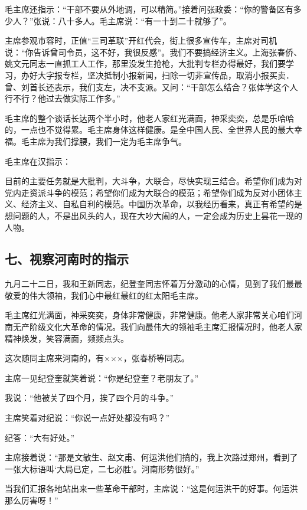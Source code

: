 毛主席还指示：“干部不要从外地调，可以精简。”接着问张政委：“你的警备区有多少人？”张说：八十多人。毛主席说：“有一十到二十就够了”。

主席参观市容时，正值“三司革联”开红代会，街上很多宣传车，主席对司机说：“你告诉曾司令员，这不好，我很反感”。我们不要搞经济主义。上海张春侨、姚文元同志一直抓工人工作，那里没发生抢枪，大批判专栏办得最好，我们要学习，办好大字报专栏，坚决抵制小报新闻，扫除一切非宣传品，取消小报买卖．曾、刘首长还表示，我们支左，决不支派。又问：“干部怎么结合？张体学这个人行不行？他过去做实际工作多。”

毛主席的整个谈话长达两个半小时，他老人家红光满面，神采奕奕，总是乐哈哈的，一点也不觉得累。毛主席身体这样健康。是全中国人民、全世界人民的最大幸福。毛主席为我们撑腰，我们一定为毛主席争气。


毛主席在汉指示：

目前的主要任务就是大批判，大斗争，大联合，尽快实现三结合。希望你们成为对党内走资派斗争的模范；希望你们成为大联合的模范；希望你们成为反对小团体主义、经济主义、自私自利的模范。中国历次革命，以我经历看来，真正有希望的是想问题的人，不是出风头的人，现在大吵大闹的人，一定会成为历史上昙花一现的人物。

\subsection{七、视察河南时的指示}

九月二十二日，我和王新同志，纪登奎同志怀着万分激动的心情，见到了我们最最敬爱的伟大领袖，我们心中最红最红的红太阳毛主席。

毛主席红光满面，神采奕奕，身体非常健康，非常健康。他老人家非常关心咱们河南无产阶级文化大革命的情况。我们向最伟大的领袖毛主席汇报情况时，他老人家精神焕发，笑容满面，频频点头。

这次随同主席来河南的，有×××，张春桥等同志。

主席一见纪登奎就笑着说：“你是纪登奎？老朋友了。”

我说：“他被关了四个月，挨了四个月的斗争。”

主席笑着对纪说：“你说一点好处都没有吗？”

纪答：“大有好处。”

主席接着说：“那是文敏生、赵文甫、何运洪他们搞的，我上次路过郑州，看到了一张大标语叫‘大局已定，二七必胜’。河南形势很好。”

当我们汇报各地站出来一些革命干部时，主席说：“这是何运洪干的好事。何运洪那么厉害呀！”

